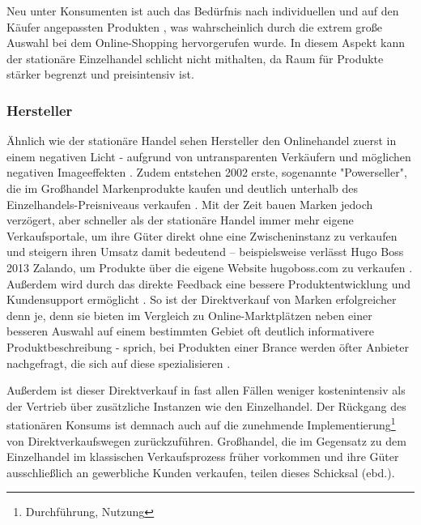 \documentclass[a4paper, 12pt]{scrartcl}
\makeatletter
\newenvironment{folding}{\endgroup}{\begingroup \def \@currenvir{folding}\edef \@currenvline{\on@line}}
\makeatother
\begin{document}
\begin{folding}
Neu unter Konsumenten ist auch das Bedürfnis nach individuellen und auf den Käufer angepassten Produkten \cite[S. 43]{Nitt}, was wahrscheinlich durch die extrem große Auswahl bei dem Online-Shopping hervorgerufen wurde. In diesem Aspekt kann der stationäre Einzelhandel schlicht nicht mithalten, da Raum für Produkte stärker begrenzt und preisintensiv ist.

\end{folding}

\begin{folding} \subsubsection{Hersteller}

Ähnlich wie der stationäre Handel sehen Hersteller den Onlinehandel zuerst in einem negativen Licht - aufgrund von untransparenten Verkäufern und möglichen negativen Imageeffekten \cite[S. 20]{Graf}. Zudem entstehen 2002 erste, sogenannte "Powerseller", die im Großhandel Markenprodukte kaufen und deutlich unterhalb des Einzelhandels-Preisniveaus verkaufen \cite[S. 26]{Graf}. Mit der Zeit bauen Marken jedoch verzögert, aber schneller als der stationäre Handel immer mehr eigene Verkaufsportale, um ihre Güter direkt ohne eine Zwischeninstanz zu verkaufen und steigern ihren Umsatz damit bedeutend – beispielsweise verlässt Hugo Boss 2013 Zalando, um Produkte über die eigene Website hugoboss.com zu verkaufen \cite[S. 48f]{Graf}. Außerdem wird durch das direkte Feedback eine bessere Produktentwicklung und Kundensupport ermöglicht \cite[S. 39]{Graf}. So ist der Direktverkauf von Marken erfolgreicher denn je, denn sie bieten im Vergleich zu Online-Marktplätzen neben einer besseren Auswahl auf einem bestimmten Gebiet oft deutlich informativere Produktbeschreibung - sprich, bei Produkten einer Brance werden öfter Anbieter nachgefragt, die sich auf diese spezialisieren \cite[S. 18f]{evilcom}.

Außerdem ist dieser Direktverkauf in fast allen Fällen weniger kostenintensiv als der Vertrieb über zusätzliche Instanzen wie den Einzelhandel. Der Rückgang des stationären Konsums ist demnach auch auf die zunehmende Implementierung\footnote{Durchführung, Nutzung} von Direktverkaufswegen zurückzuführen. Großhandel, die im Gegensatz zu dem Einzelhandel im klassischen Verkaufsprozess früher vorkommen und ihre Güter ausschließlich an gewerbliche Kunden verkaufen, teilen dieses Schicksal (ebd.).

\end{folding}
\end{document}

